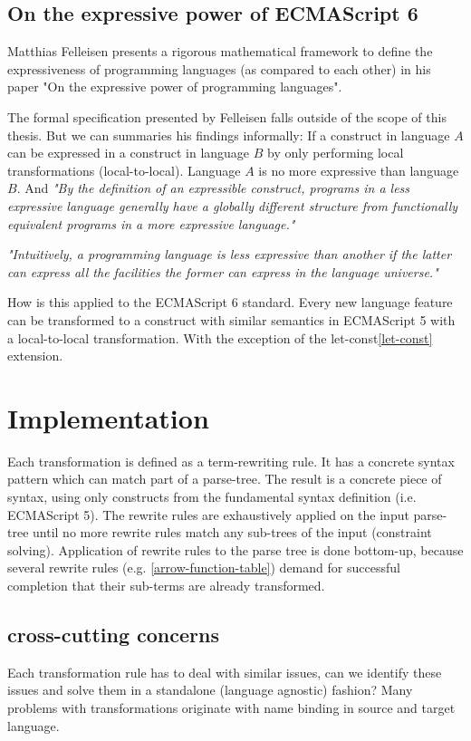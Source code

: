 \subsection{On the expressive power of ECMAScript 6}
Matthias Felleisen presents a rigorous mathematical framework to define the expressiveness of programming languages (as compared to each other) in his paper "On the expressive power of programming languages"\cite{Felleisen1990}. 

The formal specification presented by Felleisen falls outside of the scope of this thesis. But we can summaries his findings informally: If a construct in language $A$ can be expressed in a construct in language $B$ by only performing local transformations (local-to-local). Language $A$ is no more expressive than language $B$. And \textit{"By the definition of an expressible construct, programs in a less expressive language generally have a globally different structure from functionally equivalent programs in a more expressive language."}\cite{Felleisen1990} 

\textit{"Intuitively, a programming language is less expressive than another if the latter can express all the facilities the former can express in the language universe."}\cite{Felleisen1990}

How is this applied to the ECMAScript 6 standard. Every new language feature can be transformed to a construct with similar semantics in ECMAScript 5 with a local-to-local transformation. With the exception of the let-const\ref{let-const} extension.

\section{Implementation}
Each transformation is defined as a term-rewriting rule. It has a concrete syntax pattern which can match part of a parse-tree. The result is a concrete piece of syntax, using only constructs from the fundamental syntax definition (i.e. ECMAScript 5).
The rewrite rules are exhaustively applied on the input parse-tree until no more rewrite rules match any sub-trees of the input (constraint solving). Application of rewrite rules to the parse tree is done bottom-up, because several rewrite rules (e.g. \ref{arrow-function-table}) demand for successful completion that their sub-terms are already transformed.

\subsection{cross-cutting concerns}
Each transformation rule has to deal with similar issues, can we identify these issues and solve them in a standalone (language agnostic) fashion?
Many problems with transformations originate with name binding in source and target language.

